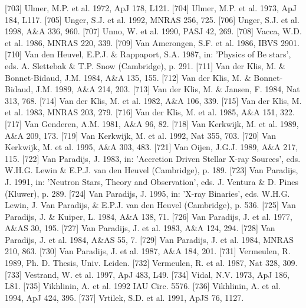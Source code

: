 \documentclass{aa}
\begin{document}
\begin{thebibliography}{}
\bibitem[]{}[703] Ulmer, M.P. et al. 1972, ApJ 178, L121.
\bibitem[]{}[704] Ulmer, M.P. et al. 1973, ApJ 184, L117.
\bibitem[]{}[705] Unger, S.J. et al. 1992, MNRAS 256, 725.
\bibitem[]{}[706] Unger, S.J. et al. 1998, A\&A 336, 960.
\bibitem[]{}[707] Unno, W. et al. 1990, PASJ 42, 269.
\bibitem[]{}[708] Vacca, W.D. et al. 1986, MNRAS 220, 339.
\bibitem[]{}[709] Van Amerongen, S.F. et al. 1986, IBVS 2901.
\bibitem[]{}[710] Van den Heuvel, E.P.J. \& Rappaport, S.A. 1987, in: 'Physics of Be stars', 
                                 eds. A. Slettebak \& T.P. Snow (Cambridge), p. 291.   
\bibitem[]{}[711] Van der Klis, M. \& Bonnet-Bidaud, J.M. 1984, A\&A 135, 155.
\bibitem[]{}[712] Van der Klis, M. \& Bonnet-Bidaud, J.M. 1989, A\&A 214, 203.
\bibitem[]{}[713] Van der Klis, M. \& Jansen, F. 1984, Nat 313, 768.
\bibitem[]{}[714] Van der Klis, M. et al. 1982, A\&A 106, 339.
\bibitem[]{}[715] Van der Klis, M. et al. 1983, MNRAS 203, 279.
\bibitem[]{}[716] Van der Klis, M. et al. 1985, A\&A 151, 322.
\bibitem[]{}[717] Van Genderen, A.M. 1981, A\&A 96, 82.
\bibitem[]{}[718] Van Kerkwijk, M. et al. 1989, A\&A 209, 173.
\bibitem[]{}[719] Van Kerkwijk, M. et al. 1992, Nat 355, 703.
\bibitem[]{}[720] Van Kerkwijk, M. et al. 1995, A\&A 303, 483.
\bibitem[]{}[721] Van Oijen, J.G.J. 1989, A\&A 217, 115.
\bibitem[]{}[722] Van Paradijs, J. 1983, in: 'Accretion Driven Stellar X-ray Sources',
                                 eds. W.H.G. Lewin \& E.P.J. van den Heuvel (Cambridge), p. 189.
\bibitem[]{}[723] Van Paradijs, J. 1991, in: 'Neutron Stars, Theory and Observation', 
                                 eds. J. Ventura \& D. Pines (Kluwer), p. 289.
\bibitem[]{}[724] Van Paradijs, J. 1995, in: 'X-ray Binaries',
                                 eds. W.H.G. Lewin, J. Van Paradijs, \& E.P.J. van den Heuvel (Cambridge), p. 536.
\bibitem[]{}[725] Van Paradijs, J. \& Kuiper, L. 1984, A\&A 138, 71. 
\bibitem[]{}[726] Van Paradijs, J. et al. 1977, A\&AS 30, 195.
\bibitem[]{}[727] Van Paradijs, J. et al. 1983, A\&A 124, 294.
\bibitem[]{}[728] Van Paradijs, J. et al. 1984, A\&AS 55, 7.
\bibitem[]{}[729] Van Paradijs, J. et al. 1984, MNRAS 210, 863.
\bibitem[]{}[730] Van Paradijs, J. et al. 1987, A\&A 184, 201.
\bibitem[]{}[731] Vermeulen, R. 1989, Ph. D. Thesis, Univ. Leiden.
\bibitem[]{}[732] Vermeulen, R. et al. 1987, Nat 328, 309.
\bibitem[]{}[733] Vestrand, W. et al. 1997, ApJ 483, L49.
\bibitem[]{}[734] Vidal, N.V. 1973, ApJ 186, L81.
\bibitem[]{}[735] Vikhlinin, A. et al. 1992 IAU Circ. 5576.
\bibitem[]{}[736] Vikhlinin, A. et al. 1994, ApJ 424, 395.
\bibitem[]{}[737] Vrtilek, S.D. et al. 1991, ApJS 76, 1127.

\end{thebibliography}
\end{document}
